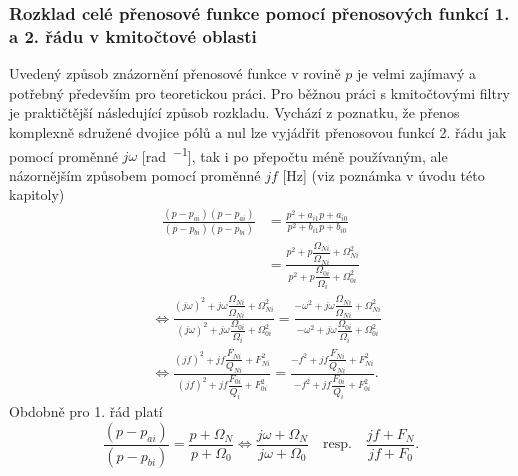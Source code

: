         \subsubsection{Rozklad celé přenosové funkce pomocí přenosových funkcí 1. a 2. řádu v
                       kmitočtové oblasti}
          
          Uvedený způsob znázornění přenosové funkce v rovině \(p\) je velmi zajímavý a potřebný
          především pro teoretickou práci. Pro běžnou práci s kmitočtovými filtry je praktičtější
          následující způsob rozkladu. Vychází z poznatku, že přenos komplexně sdružené dvojice pólů
          a nul lze vyjádřit přenosovou funkcí 2. řádu jak pomocí proměnné \(j\omega\)
          [\si{\radian\per\sec}], tak i po přepočtu méně používaným, ale názornějším způsobem pomocí
          proměnné \(jf\) [\si{\Hz}] (viz poznámka v úvodu této kapitoly) 
          \begin{align}\label{aes:eq033}
            \frac{(p-p_{ai})(p-p_{ai})}{(p-p_{bi})(p-p_{bi})}
              &= \frac{p^2 + a_{i1}p + a_{i0}}{p^2 + b_{i1}p + b_{i0}}          \nonumber \\ 
              &= \frac{p^2 + p\dfrac{\Omega_{Ni}}{\Omega_{Ni}} +\Omega^2_{Ni}}
                      {p^2 + p\dfrac{\Omega_{0i}}{\Omega_{i}} +\Omega^2_{0i}}        
          \end{align}
          \begin{align}\label{aes:eq040}   
            &\Leftrightarrow
             \frac{(j\omega)^2 + j\omega\dfrac{\Omega_{Ni}}{\Omega_{Ni}} +\Omega^2_{Ni}}
                  {(j\omega)^2 + j\omega\dfrac{\Omega_{0i}}{\Omega_{i}} +\Omega^2_{0i}}
            =\frac{-\omega^2   + j\omega\dfrac{\Omega_{Ni}}{\Omega_{Ni}} +\Omega^2_{Ni}}
                  {-\omega^2   + j\omega\dfrac{\Omega_{0i}}{\Omega_{i}} +\Omega^2_{0i}} \nonumber \\   
            &\Leftrightarrow
              \frac{(jf)^2 + jf\dfrac{F_{Ni}}{Q_{Ni}} + F^2_{Ni}}
                   {(jf)^2 + jf\dfrac{F_{0i}}{Q_{i}}  + F^2_{0i}}
            = \frac{-f^2   + jf\dfrac{F_{Ni}}{Q_{Ni}} + F^2_{Ni}}
                   {-f^2   + jf\dfrac{F_{0i}}{Q_{i}}  + F^2_{0i}}. 
          \end{align}
          Obdobně pro 1. řád platí
          \begin{equation}\label{aes:eq034}
            \frac{(p-p_{ai})}{(p-p_{bi})} = \frac{p + \Omega_N}{p + \Omega_0} \Leftrightarrow
            \frac{j\omega + \Omega_N}{j\omega + \Omega_0}\quad\text{resp.}\quad
            \frac{jf + F_N}{jf + F_0}.
          \end{equation}
                    
